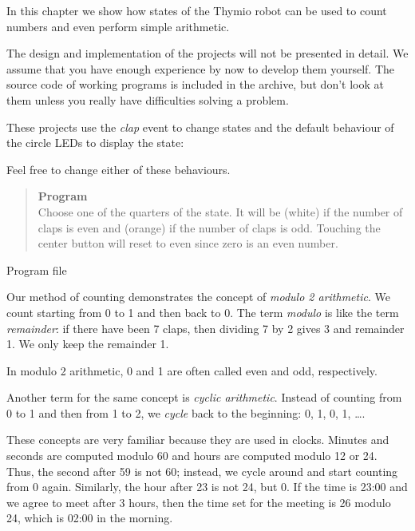 
\label{ch.counting}

In this chapter we show how states of the Thymio robot can be used to
count numbers and even perform simple arithmetic.

The design and implementation of the projects will not be presented
in detail. We assume that you have enough experience by now to develop
them yourself. The source code of working programs is included in the
archive, but don't look at them unless you really have difficulties
solving a problem.

These projects use the \emph{clap} event to change states and
the default behaviour of the circle LEDs to display the state:


Feel free to change either of these behaviours.


\begin{quote}
\textbf{Program}\\Choose one of the quarters of the state.
It will be  (white) if the number of claps
is even and  (orange) if the number of claps is odd.
Touching the center button will reset to even
since zero is an even number.
\end{quote}

{\raggedleft \hfill Program file }

Our method of counting demonstrates the concept of
\emph{modulo 2 arithmetic}.
We count starting from 0 to 1 and then back to 0.
The term \emph{modulo} is like the term \emph{remainder}:
if there have been 7 claps, then dividing 7 by 2 gives 3 and
remainder 1.
We only keep the remainder 1.

In modulo 2 arithmetic, 0 and 1 are often called even and odd,
respectively.

Another term for the same concept is \emph{cyclic arithmetic}.
Instead of counting from 0 to 1 and then from 1 to 2,
we \emph{cycle} back to the beginning:
0, 1, 0, 1, \ldots.

These concepts are very familiar because they are used in clocks.
Minutes and seconds are computed modulo 60 and hours are computed modulo
12 or 24. Thus, the second after 59 is not 60; instead, we cycle around
and start counting from 0 again. Similarly, the hour after 23 is not 24,
but 0. If the time is 23:00 and we agree to meet after 3 hours,
then the time set for the meeting is 26 modulo 24, which is 02:00 in the
morning.

